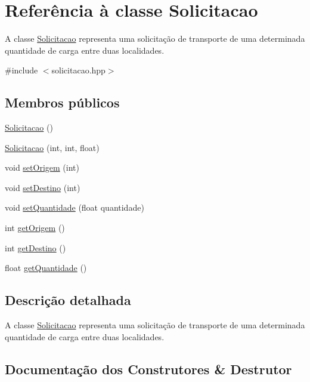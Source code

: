 \hypertarget{classSolicitacao}{}\section{Referência à classe Solicitacao}
\label{classSolicitacao}


A classe \hyperlink{classSolicitacao}{Solicitacao} representa uma solicitação de transporte de uma determinada quantidade de carga entre duas localidades.  




{\ttfamily \#include $<$solicitacao.\+hpp$>$}

\subsection*{Membros públicos}
\begin{DoxyCompactItemize}
\item 
\hyperlink{classSolicitacao_a67c9ab7bb3295e4a5a0933486f7e0f4b}{Solicitacao} ()
\item 
\hyperlink{classSolicitacao_a7488a91778013e8666db5f3dde061e2c}{Solicitacao} (int, int, float)
\item 
void \hyperlink{classSolicitacao_a585f55cfa44c1e16d535935eead17f44}{set\+Origem} (int)
\item 
void \hyperlink{classSolicitacao_ac772a2517a1d395f1a541424d29716cd}{set\+Destino} (int)
\item 
void \hyperlink{classSolicitacao_acf1db9c6843df635aca0bbacae8cf7c7}{set\+Quantidade} (float quantidade)
\item 
int \hyperlink{classSolicitacao_a53a5b37dd6aca895d84ef9991fc7775b}{get\+Origem} ()
\item 
int \hyperlink{classSolicitacao_a8448e5d5b0ca18b7e8ff022415ec6836}{get\+Destino} ()
\item 
float \hyperlink{classSolicitacao_a7e936983b3b1c6d4010649edcbac4819}{get\+Quantidade} ()
\end{DoxyCompactItemize}


\subsection{Descrição detalhada}
A classe \hyperlink{classSolicitacao}{Solicitacao} representa uma solicitação de transporte de uma determinada quantidade de carga entre duas localidades. 

\subsection{Documentação dos Construtores \& Destrutor}
\mbox{\label{classSolicitacao_a67c9ab7bb3295e4a5a0933486f7e0f4b}} 
